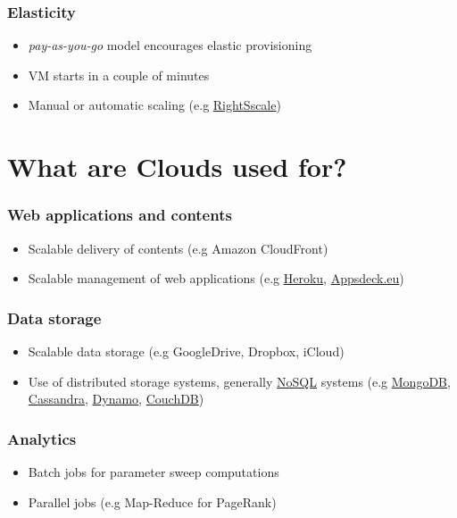 \documentclass[bigger,hyperref={colorlinks=true, urlcolor=red, plainpages=false, pdfpagelabels, bookmarksnumbered}]{beamer}
\begin{document}
\begin{frame}
\frametitle{Elasticity}
\label{sec-2-7}

\begin{itemize}
\item \emph{pay-as-you-go} model encourages elastic provisioning
\item VM starts in a couple of minutes
\item Manual or automatic scaling (e.g \href{http://www.rightscale.com}{RightSscale})
\end{itemize}
\end{frame}
\section{What are Clouds used for?}
\label{sec-3}
\begin{frame}
\frametitle{Web applications and contents}
\label{sec-3-1}

\begin{itemize}
\item Scalable delivery of contents 
     (e.g Amazon CloudFront)
\item Scalable management of web applications
     \newline
     (e.g \href{http://www.heroku.com}{Heroku}, \href{http://appsdeck.eu}{Appsdeck.eu})
\end{itemize}
     
\end{frame}
\begin{frame}
\frametitle{Data storage}
\label{sec-3-2}

\begin{itemize}
\item Scalable data storage \newline
    (e.g GoogleDrive, Dropbox, iCloud)
\item Use of distributed storage systems, generally \href{http://en.wikipedia.org/wiki/NoSQL}{NoSQL} systems
     (e.g \href{https://www.mongodb.org}{MongoDB}, \href{http://cassandra.apache.org}{Cassandra}, \href{http://aws.amazon.com/dynamodb/}{Dynamo}, \href{http://couchdb.apache.org}{CouchDB})
\end{itemize}
\end{frame}
\begin{frame}
\frametitle{Analytics}
\label{sec-3-3}

\begin{itemize}
\item Batch jobs for parameter sweep computations
\item Parallel jobs  (e.g Map-Reduce for PageRank)
\end{itemize}
\end{frame}
\end{document}
